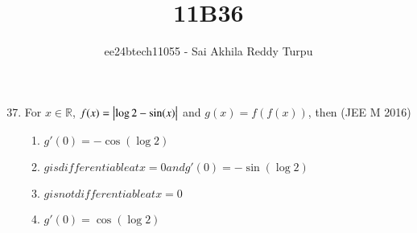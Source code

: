 \documentclass[journal,12pt,twocolumn]{IEEEtran}
\theoremstyle{remark}
\begin{document}

\vspace{3cm}

\title{11B36}
\author{ee24btech11055 - Sai Akhila Reddy Turpu}
\maketitle
\newpage
\bigskip

\renewcommand{\thefigure}{\theenumi}
\renewcommand{\thetable}{\theenumi}
\begin{enumerate}
		\setcounter{enumi}{36}


	\item For $x\in\mathbb{R}$, $f(x)=\left\vert\log 2-\sin(x)\right\vert$ and 
	$g(x)=f(f(x))$, then 
	\hfill{(JEE M 2016)}
	\begin{enumerate}[label=(\alph*)]
		\item $g'(0) = -\cos(\log 2)$
		\item $g is differentiable at x=0 and g'(0) = -\sin(\log 2)$
		\item $g is not differentiable at x=0$
		\item $g'(0) =  \cos(\log 2)$
	\end{enumerate}


\end{enumerate}
\end{document}
